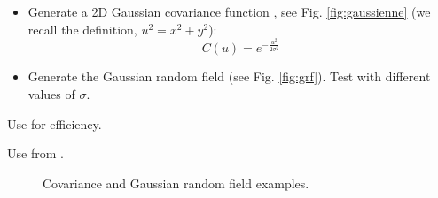 \begin{qbox}
\begin{itemize}
 \item Generate a 2D Gaussian covariance function , see Fig. \ref{fig:gaussienne} (we recall the definition, $u^2=x^2+y^2$):
 $$C(u)=e^{-\frac{u^2}{2\sigma^2}}$$
 

 \item Generate the Gaussian random field (see Fig. \ref{fig:grf}). Test with different values of $\sigma$.
\end{itemize}
\end{qbox}

\begin{mcomment}
\begin{mremark}
 Use  for efficiency.
\end{mremark}
\end{mcomment}

\begin{pcomment}
\begin{premark}
 Use  from .
\end{premark}
\end{pcomment}



\begin{figure}[H]
  \centering\caption{Covariance and Gaussian random field examples.}%
 \hfill
\end{figure}
